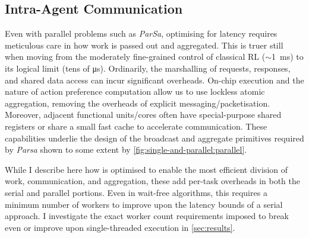 \subsection{Intra-Agent Communication}\label{sec:intra-agent-communication}
Even with parallel problems such as \emph{ParSa}, optimising for latency requires meticulous care in how work is passed out and aggregated.
This is truer still when moving from the moderately fine-grained control of classical RL ($\sim$\qty{1}{\milli\second}) to its logical limit (tens of \si{\micro\second}).
Ordinarily, the marshalling of requests, responses, and shared data access can incur significant overheads.
On-chip execution and the nature of action preference computation allow us to use lockless atomic aggregation, removing the overheads of explicit messaging/packetisation.
Moreover, adjacent functional units/cores often have special-purpose shared registers or share a small fast cache to accelerate communication.
These capabilities underlie the design of the broadcast and aggregate primitives required by \emph{Parsa} shown to some extent by \cref{fig:single-and-parallel:parallel}.

While I describe here how \approachshort{} is optimised to enable the most efficient division of work, communication, and aggregation, these add per-task overheads in both the serial and parallel portions.
Even in wait-free algorithms, this requires a minimum number of workers to improve upon the latency bounds of a serial approach.
I investigate the exact worker count requirements imposed to break even or improve upon single-threaded execution in \cref{sec:results}.


%

